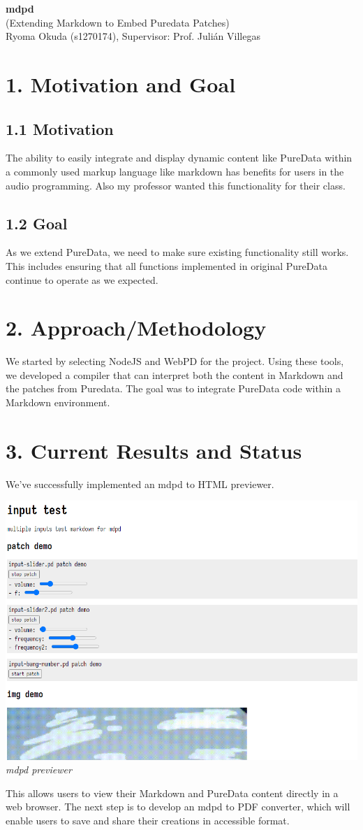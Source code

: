 \documentclass[12pt,a4paper]{article}
\begin{document}
\begin{center}
{\LARGE \textbf{mdpd}}\\
{\large (Extending Markdown to Embed Puredata Patches)}\\
\vspace{1em}
{\normalsize Ryoma Okuda (s1270174), Supervisor: Prof. Julián Villegas}\\
\end{center}
\begin{multicols}{2}
\section*{1. Motivation and Goal}
\subsection*{1.1 Motivation}
The ability to easily integrate and display dynamic content like PureData within a commonly used markup language like markdown has benefits for users in the audio programming. Also my professor wanted this functionality for their class.
\subsection*{1.2 Goal}
As we extend PureData, we need to make sure existing functionality still works. This includes ensuring that all functions implemented in original PureData continue to operate as we expected.
\section*{2. Approach/Methodology}
We started by selecting NodeJS and WebPD for the project. Using these tools, we developed a compiler that can interpret both the content in Markdown and the patches from Puredata. 
The goal was to integrate PureData code within a Markdown environment.
\section*{3. Current Results and Status}
We've successfully implemented an mdpd to HTML previewer. 

\includegraphics[width=0.5\linewidth]{mdpd_ss.png}
\\ \textit{mdpd previewer}


This allows users to view their Markdown and PureData content directly in a web browser.
The next step is to develop an mdpd to PDF converter, which will enable users to save and share their creations in accessible format. 
\end{multicols}
\end{document}
